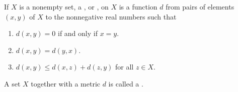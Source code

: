 If $X$ is a nonempty set, a , or , on $X$ is a function $d$ from pairs of elements $(x, y)$ of $X$ to the nonnegative real numbers such that
\begin{enumerate}
\item $d(x, y) = 0$ if and only if $x = y$.
\item $d(x, y) = d(y, x)$.
\item $d(x, y) \leq d(x, z) + d(z, y)$ for all $z \in X$.
\end{enumerate}
A set $X$ together with a metric $d$ is called a .
